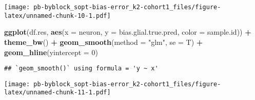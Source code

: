 \documentclass[
]{article}
\newenvironment{Shaded}{\begin{snugshade}}{\end{snugshade}}
\newcommand{\AttributeTok}[1]{\textcolor[rgb]{0.13,0.29,0.53}{#1}}
\newcommand{\DecValTok}[1]{\textcolor[rgb]{0.00,0.00,0.81}{#1}}
\newcommand{\FunctionTok}[1]{\textcolor[rgb]{0.13,0.29,0.53}{\textbf{#1}}}
\newcommand{\NormalTok}[1]{#1}
\newcommand{\SpecialCharTok}[1]{\textcolor[rgb]{0.81,0.36,0.00}{\textbf{#1}}}
\newcommand{\StringTok}[1]{\textcolor[rgb]{0.31,0.60,0.02}{#1}}
\begin{document}
\texttt{[image: pb-byblock\_sopt-bias-error\_k2-cohort1\_files/figure-latex/unnamed-chunk-10-1.pdf]}

\begin{Shaded}
\begin{Highlighting}[]
\FunctionTok{ggplot}\NormalTok{(df.res, }\FunctionTok{aes}\NormalTok{(}\AttributeTok{x =}\NormalTok{ neuron, }\AttributeTok{y =}\NormalTok{ bias.glial.true.pred, }\AttributeTok{color =}\NormalTok{ sample.id)) }\SpecialCharTok{+} 
  \FunctionTok{theme\_bw}\NormalTok{() }\SpecialCharTok{+} \FunctionTok{geom\_smooth}\NormalTok{(}\AttributeTok{method =} \StringTok{"glm"}\NormalTok{, }\AttributeTok{se =}\NormalTok{ T) }\SpecialCharTok{+} \FunctionTok{geom\_hline}\NormalTok{(}\AttributeTok{yintercept =} \DecValTok{0}\NormalTok{)}
\end{Highlighting}
\end{Shaded}

\begin{verbatim}
## `geom_smooth()` using formula = 'y ~ x'
\end{verbatim}

\texttt{[image: pb-byblock\_sopt-bias-error\_k2-cohort1\_files/figure-latex/unnamed-chunk-11-1.pdf]}
\end{document}
